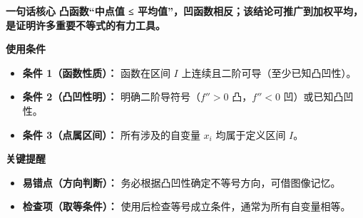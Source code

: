 \begin{summarybox}
\textbf{\textcolor{CSummary}{一句话核心}}
\textbf{凸函数“中点值 ≤ 平均值”，凹函数相反；该结论可推广到加权平均，是证明许多重要不等式的有力工具。}

\medskip
\textbf{\textcolor{CSummary}{使用条件}}
\begin{itemize}[leftmargin=*, itemsep=0.5em, topsep=0.4em]
    \item \textbf{条件 1（函数性质）：} 函数在区间 $I$ 上连续且二阶可导（至少已知凸凹性）。
    \item \textbf{条件 2（凸凹性明）：} 明确二阶导符号（$f''>0$ 凸，$f''<0$ 凹）或已知凸凹性。
    \item \textbf{条件 3（点属区间）：} 所有涉及的自变量 $x_i$ 均属于定义区间 $I$。
\end{itemize}

\medskip
\textbf{\textcolor{CSummary}{关键提醒}}
\begin{itemize}[leftmargin=*, itemsep=0.5em, topsep=0.4em]
    \item \textbf{易错点（方向判断）：} 务必根据凸凹性确定不等号方向，可借图像记忆。
    \item \textbf{检查项（取等条件）：} 使用后检查等号成立条件，通常为所有自变量相等。
\end{itemize}
\end{summarybox}
